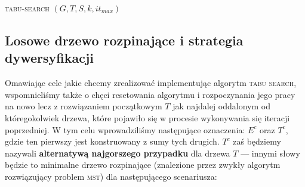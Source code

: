 \begin{pseudokod}
	\DontPrintSemicolon
	\caption{\textsc{tabu-search} $\left( G, T, S, k, it_{max} \right)$}
	\label{alg:tabusearch}
\end{pseudokod}

\subsection{Losowe drzewo rozpinające i strategia dywersyfikacji}

Omawiając cele jakie chcemy zrealizować implementując algorytm \textsc{tabu search}, wspomnieliśmy także o chęci resetowania algorytmu i rozpoczynania jego pracy na nowo lecz z rozwiązaniem początkowym $T$ jak najdalej oddalonym od któregokolwiek drzewa, które pojawiło się w procesie wykonywania się iteracji poprzedniej. W tym celu wprowadziliśmy następujące oznaczenia: $E^{c}$ oraz $T^{c}$, gdzie ten pierwszy jest konstruowany z sumy tych drugich. $T^{c}$ zaś będziemy nazywali \textbf{alternatywą najgorszego przypadku} dla drzewa $T$ --- innymi słowy będzie to minimalne drzewo rozpinające (znalezione przez zwykły algorytm rozwiązujący problem \textsc{mst}) dla następującego scenariusza:

